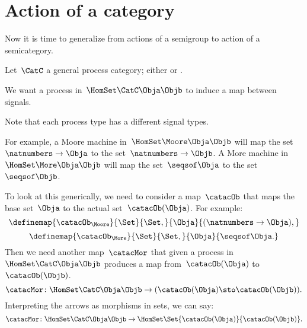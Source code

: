 \section{Action of a category}




Now it is time to generalize from actions of a semigroup to action of a semicategory.

Let~$\CatC$ a general process category; either \Moore or \More. %

We want a process in~$\HomSet\CatC\Obja\Objb$ to induce a map between signals.

Note that each process type has a different signal types.

For example, a Moore machine in~$\HomSet\Moore\Obja\Objb$ will map the set~$\natnumbers \to \Obja$ to the set~$\natnumbers \to \Objb$.
A More machine in~$\HomSet\More\Obja\Objb$  will map the set~$\seqsof \Obja$ to the set~$\seqsof \Objb$.

To look at this generically, we need to consider a map~$\catacOb$ that maps the base set~$\Obja$ to the actual set~$\catacOb(\Obja)$.
For example:
%
\begin{equation}
    \definemap{\catacOb_{\Moore}}{\Set}{\Set,}{\Obja}{(\natnumbers \to \Obja),}
\end{equation}
%
\begin{equation}
    \definemap{\catacOb_{\More}}{\Set}{\Set,}{\Obja}{\seqsof \Obja.}
\end{equation}
%
Then we need another map~$\catacMor$ that given a process in~$\HomSet\CatC\Obja\Objb$ produces a map from~$\catacOb(\Obja)$ to~$\catacOb(\Objb)$.
%
\begin{equation}
    \label{eq:gamma-1}
    \catacMor\colon \HomSet\CatC\Obja\Objb \to  (\catacOb(\Obja) \sto \catacOb(\Objb)).
\end{equation}
%
Interpreting the arrows as morphisms in sets, we can say:
%
\begin{equation}
    \label{eq:gamma-2}
    \catacMor\colon \HomSet\CatC\Obja\Objb \to  \HomSet\Set{\catacOb(\Obja)}{\catacOb(\Objb) }.
\end{equation}
%

